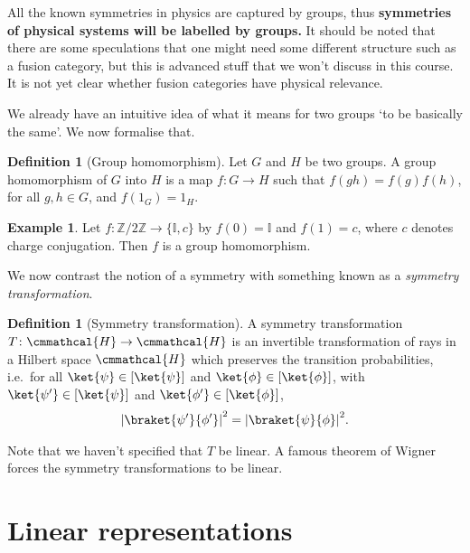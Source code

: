 \documentclass[a4 paper, 12pt]{book}
\renewcommand{\mathcal}{\cmmathcal}
\theoremstyle{definition}
\newtheorem{definition}[theorem]{Definition}
\newtheorem{example}[theorem]{Example}
\newcommand{\ii}{\mathbb{I}}
\newcommand{\zz}{\mathbb{Z}}
\DeclarePairedDelimiter{\abs}{\lvert}{\rvert}
\newcommand{\hilbert}{\mathcal{H}}
\begin{document}
	All the known symmetries in physics are captured by groups, thus \textbf{symmetries of physical systems will be labelled by groups.} It should be noted that there are some speculations that one might need some different structure such as a fusion category, but this is advanced stuff that we won't discuss in this course. It is not yet clear whether fusion categories have physical relevance.

	We already have an intuitive idea of what it means for two groups `to be basically the same'. We now formalise that.
	\begin{definition}[Group homomorphism]
	    Let \(G\) and \(H\) be two groups. A group homomorphism of \(G\) into \(H\) is a map \(f \colon G \rightarrow H\) such that \(f(gh) = f(g) f(h)\), for all \(g, h \in G\), and \(f(1_G) = 1_H\).
	\end{definition}

	\begin{example}
		Let \(f \colon \zz/2\zz \rightarrow \{\ii, c\}\) by \(f(0) = \ii\) and \(f(1) = c\), where \(c\) denotes charge conjugation. Then \(f\) is a group homomorphism.
	\end{example}

	We now contrast the notion of a symmetry with something known as a \textit{symmetry transformation}.
	\begin{definition}[Symmetry transformation]
		A symmetry transformation \(T \colon \hilbert \rightarrow \hilbert\) is an invertible transformation of rays in a Hilbert space \(\hilbert\) which preserves the transition probabilities, i.e.\ for all \(\ket{\psi} \in [\ket{\psi}]\) and \(\ket{\phi} \in [\ket{\phi}]\), with \(\ket{\psi'} \in [\ket{\psi}]\) and \(\ket{\phi'} \in [\ket{\phi}]\),
		\begin{align*}
			{\abs{\braket{\psi'}{\phi'}}}^2 = {\abs{\braket{\psi}{\phi}}}^2.
		\end{align*}
	\end{definition}
	Note that we haven't specified that \(T\) be linear. A famous theorem of Wigner forces the symmetry transformations to be linear.

	\section{Linear representations}
\end{document}
